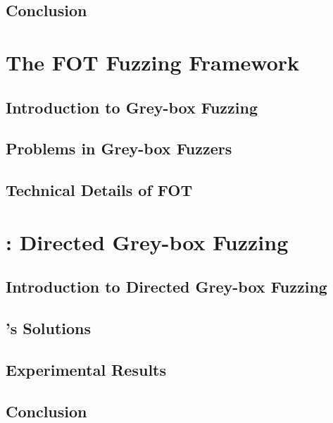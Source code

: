 \documentclass[12pt, a4paper, oneside]{Thesis}
\begin{document}
\section{Conclusion}
 
\fancyhead[RE,LO]{\fancyplain{}{\leftmark}}
\renewcommand{\chaptermark}[1]{\markboth{\chaptername\ \thechapter.\ \emph{The FOT Fuzzing Framework}}{}}


\chapter{The FOT Fuzzing Framework} \label{Chapter6}

\section{Introduction to Grey-box Fuzzing}

\section{Problems in Grey-box Fuzzers}


\section{Technical Details of FOT}
 
\fancyhead[RE,LO]{\fancyplain{}{\leftmark}}
\renewcommand{\chaptermark}[1]{\markboth{\chaptername\ \thechapter.\ \emph{\dFOT: Directed Grey-box Fuzzing}}{}}


\chapter{\dFOT: Directed Grey-box Fuzzing} \label{Chapter7}

\section{Introduction to Directed Grey-box Fuzzing}

\section{\dFOT's Solutions}

\section{Experimental Results}

\section{Conclusion}
 
\end{document}
